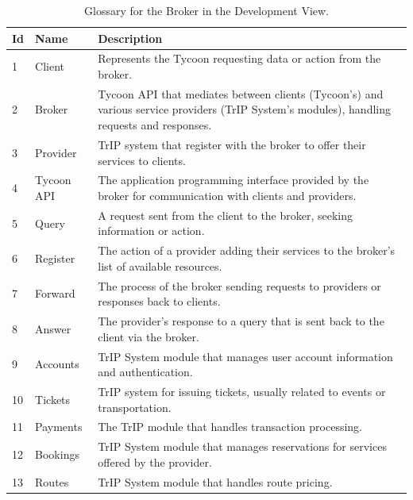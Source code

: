 \begin{table}[H]
    \centering
    \caption{Glossary for the Broker in the Development View.}
    \label{tab:broker_development_glossary}
    \begin{tabular}{@{}llp{10cm}@{}}
        \toprule
    \textbf{Id} & \textbf{Name} & \textbf{Description} \\
    \midrule
    1 & Client & Represents the Tycoon requesting data or action from the broker. \\
    2 & Broker & Tycoon API that mediates between clients (Tycoon's) and various service providers (TrIP System's modules), handling requests and responses. \\
    3 & Provider & TrIP system that register with the broker to offer their services to clients. \\
    4 & Tycoon API & The application programming interface provided by the broker for communication with clients and providers. \\
    5 & Query & A request sent from the client to the broker, seeking information or action. \\
    6 & Register & The action of a provider adding their services to the broker's list of available resources. \\
    7 & Forward & The process of the broker sending requests to providers or responses back to clients. \\
    8 & Answer & The provider's response to a query that is sent back to the client via the broker. \\
    9 & Accounts & TrIP System module that manages user account information and authentication. \\
    10 & Tickets & TrIP system for issuing tickets, usually related to events or transportation. \\
    11 & Payments & The TrIP module that handles transaction processing. \\
    12 & Bookings & TrIP System module that manages reservations for services offered by the provider. \\
    13 & Routes & TrIP System module that handles route pricing. \\
    \bottomrule
    \end{tabular}
\end{table}


